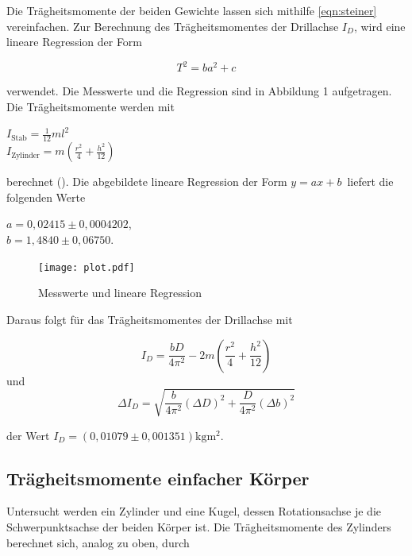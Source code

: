 Die Trägheitsmomente der beiden Gewichte lassen sich mithilfe \autoref{eqn:steiner} vereinfachen. Zur Berechnung
des Trägheitsmomentes der Drillachse $I_D$, wird eine lineare Regression der Form

\begin{equation}
  \label{eqn:linReg}
  T^2 = ba^2+c
\end{equation}


verwendet.
Die Messwerte und die Regression sind in Abbildung 1 aufgetragen. Die Trägheitsmomente werden mit
\begin{center}
  $I_{\text{Stab}} = \frac{1}{12} ml^2 $ \\
  $I_{\text{Zylinder}} = m (\frac{r^2}{4} +\frac{h^2}{12}) $ \\
\end{center}
 berechnet (\cite{Anleitung}).
Die abgebildete lineare Regression der Form $ y = ax + b \,$ liefert die folgenden Werte

\begin{center}
  $ a = 0,02415 \pm 0,0004202 $, \\
  $ b = 1,4840 \pm 0,06750 $. \\
\end{center}

\begin{figure}[H]
  \centering
  \texttt{[image: plot.pdf]}
  \caption{Messwerte und lineare Regression}
  \label{fig:Plot}
\end{figure}


Daraus folgt für das Trägheitsmomentes der Drillachse mit

\begin{equation*}
  I_D = \frac{bD}{4 \pi ^2} - 2m (\frac{r^2}{4} + \frac{h^2}{12})
\end{equation*}
und
\begin{equation*}
  \Delta I_D = \sqrt{\frac{b}{4 \pi ^2}  (\Delta D)^2 + \frac{D}{4 \pi ^2}  (\Delta b)^2}
\end{equation*}

der Wert $I_D = (0,01079 \pm 0,001351) \si{\kilogram\meter^2} $.

\subsection{Trägheitsmomente einfacher Körper}
\label{sec:Trägheitsmomente einfacher Körper}

Untersucht werden ein Zylinder und eine Kugel, dessen Rotationsachse je die Schwerpunktsachse der beiden Körper ist.
Die Trägheitsmomente des Zylinders berechnet sich, analog zu oben, durch

